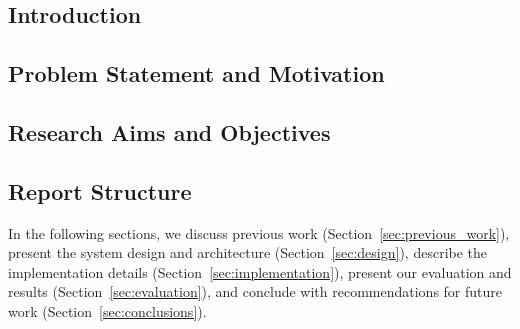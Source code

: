 \documentclass[11pt]{article}
\newif\ifguidance
\newcommand{\guidance}[1]{\ifguidance\textcolor{blue}{\small\textit{[#1]}}\fi}
\begin{document}
\begin{multicols}{2}

\section{Introduction}
\label{sec:introduction}

\guidance{%
  MARKING: The introduction also contributes to the ``Aims, Objectives and
  Project Description'' criterion (10 marks). Make the research aims and
  objectives of the project unmistakably clear. The marker will look for:
  (a) a well-motivated problem statement, (b) explicit research aims /
  objectives, (c) a summary of the approach taken, and (d) a roadmap of
  the report.}

\subsection{Problem Statement and Motivation}


\subsection{Research Aims and Objectives}

\guidance{%
  State your aims and objectives explicitly. Consider using a short
  enumerated list so the marker can see them at a glance.}


\subsection{Report Structure}

In the following sections, we discuss previous work (Section~\ref{sec:previous_work}),
present the system design and architecture (Section~\ref{sec:design}),
describe the implementation details (Section~\ref{sec:implementation}),
present our evaluation and results (Section~\ref{sec:evaluation}),
and conclude with recommendations for future work (Section~\ref{sec:conclusions}).



\end{multicols}
\end{document}
